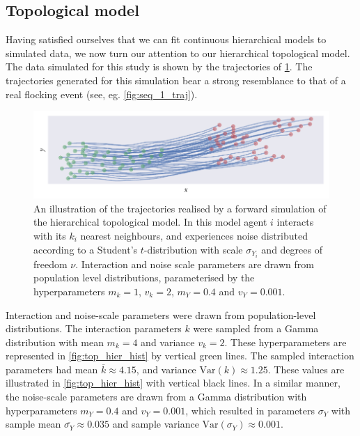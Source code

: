 \subsection{Topological model}

Having satisfied ourselves that we can fit continuous hierarchical models to
simulated data, we now turn our attention to our hierarchical topological
model. The data simulated for this study is shown by the trajectories of
\cref{fig:top_hier_sim}. The trajectories generated for this simulation bear a
strong resemblance to that of a real flocking event (see, eg.
\cref{fig:seq_1_traj}).

\begin{figure}[tbp]
  \includegraphics{top/top_hier_sim.pdf}
  \caption{An illustration of the trajectories realised by a forward
    simulation of the hierarchical topological model. In this model agent $i$
    interacts with its $k_i$ nearest neighbours, and experiences noise
    distributed according to a Student's $t$-distribution with scale
    $\sigma_{Y_i}$ and degrees of freedom $\nu$. Interaction and noise scale
    parameters are drawn from population level distributions, parameterised by the
    hyperparameters $m_k=1$, $v_k=2$, $m_Y=0.4$ and $v_Y=0.001$.}
  \label{fig:top_hier_sim}
\end{figure}

Interaction and noise-scale parameters were drawn from population-level
distributions. The interaction parameters $k$ were sampled from a Gamma
distribution with mean $m_k=4$ and variance $v_k=2$. These hyperparameters are
represented in \cref{fig:top_hier_hist} by vertical green lines. The sampled
interaction parameters had mean $\overline{k}\approx4.15$, and variance
$\text{Var}(k)\approx1.25$. These values are illustrated in
\cref{fig:top_hier_hist} with vertical black lines. In a similar manner, the
noise-scale parameters are drawn from a Gamma distribution with hyperparameters
$m_Y=0.4$ and $v_Y=0.001$, which resulted in parameters $\sigma_Y$ with sample
mean $\overline{\sigma_Y}\approx0.035$ and sample variance
$\text{Var}(\sigma_Y)\approx0.001$.


